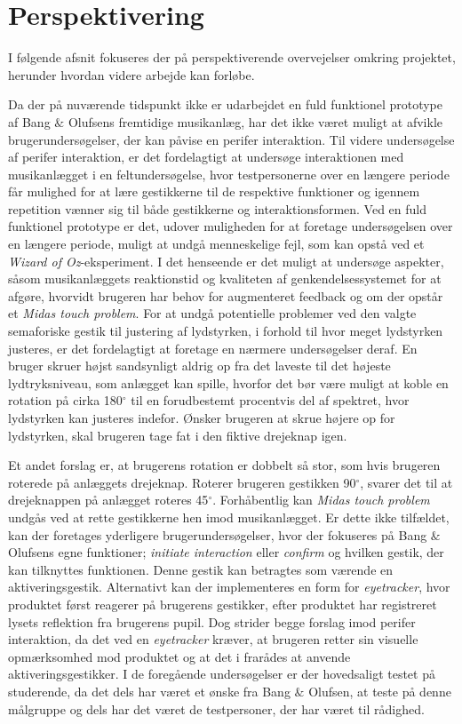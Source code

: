 \chapter{Perspektivering}
\label{Perspektivering}
%
I følgende afsnit fokuseres der på perspektiverende overvejelser omkring projektet, herunder hvordan videre arbejde kan forløbe.

Da der på nuværende tidspunkt ikke er udarbejdet en fuld funktionel prototype af Bang $\&$ Olufsens fremtidige musikanlæg, har det ikke været muligt at afvikle brugerundersøgelser, der kan påvise en perifer interaktion. Til videre undersøgelse af perifer interaktion, er det fordelagtigt at undersøge interaktionen med musikanlægget i en feltundersøgelse, hvor testpersonerne over en længere periode får mulighed for at lære gestikkerne til de respektive funktioner og igennem repetition vænner sig til både gestikkerne og interaktionsformen. Ved en fuld funktionel prototype er det, udover muligheden for at foretage undersøgelsen over en længere periode, muligt at undgå menneskelige fejl, som kan opstå ved et \textit{Wizard of Oz}-eksperiment. I det henseende er det muligt at undersøge aspekter, såsom musikanlæggets reaktionstid og kvaliteten af genkendelsessystemet for at afgøre, hvorvidt brugeren har behov for augmenteret feedback og om der opstår et \textit{Midas touch problem}.\blankline
%
For at undgå potentielle problemer ved den valgte semaforiske gestik til justering af lydstyrken, i forhold til hvor meget lydstyrken justeres, er det fordelagtigt at foretage en nærmere undersøgelser deraf. En bruger skruer højst sandsynligt aldrig op fra det laveste til det højeste lydtryksniveau, som anlægget kan spille, hvorfor det bør være muligt at koble en rotation på cirka 180$^{\circ}$ til en forudbestemt procentvis del af spektret, hvor lydstyrken kan justeres indefor. Ønsker brugeren at skrue højere op for lydstyrken, skal brugeren tage fat i den fiktive drejeknap igen. 

Et andet forslag er, at brugerens rotation er dobbelt så stor, som hvis brugeren roterede på anlæggets drejeknap. Roterer brugeren gestikken 90$^{\circ}$, svarer det til at drejeknappen på anlægget roteres 45$^{\circ}$.\blankline 
%
Forhåbentlig kan \textit{Midas touch problem} undgås ved at rette gestikkerne hen imod musikanlægget. Er dette ikke tilfældet, kan der foretages yderligere brugerundersøgelser, hvor der fokuseres på Bang $\&$ Olufsens egne funktioner; \textit{initiate interaction} eller \textit{confirm} og hvilken gestik, der kan tilknyttes funktionen. Denne gestik kan betragtes som værende en aktiveringsgestik. Alternativt kan der implementeres en form for \textit{eyetracker}, hvor produktet først reagerer på brugerens gestikker, efter produktet har registreret lysets reflektion fra brugerens pupil. Dog strider begge forslag imod perifer interaktion, da det ved en \textit{eyetracker} kræver, at brugeren retter sin visuelle opmærksomhed mod produktet og at det i  frarådes at anvende aktiveringsgestikker.\blankline   
%
I de foregående undersøgelser er der hovedsaligt testet på studerende, da det dels har været et ønske fra Bang $\&$ Olufsen, at teste på denne målgruppe og dels har det været de testpersoner, der har været til rådighed. 

